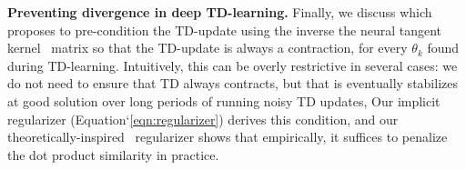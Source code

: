 \textbf{Preventing divergence in deep TD-learning.} Finally, we discuss \citet{achiam2019towards} which proposes to pre-condition the TD-update using the inverse the neural tangent kernel~\citep{ntk} matrix so that the TD-update is always a contraction, for every $\theta_k$ found during TD-learning. Intuitively, this can be overly restrictive in several cases: we do not need to ensure that TD always contracts, but that is eventually stabilizes at good solution over long periods of running noisy TD updates, Our implicit regularizer (Equation`\ref{eqn:regularizer}) derives this condition, and our theoretically-inspired \methodname\ regularizer shows that empirically, it suffices to penalize the dot product similarity in practice.   


